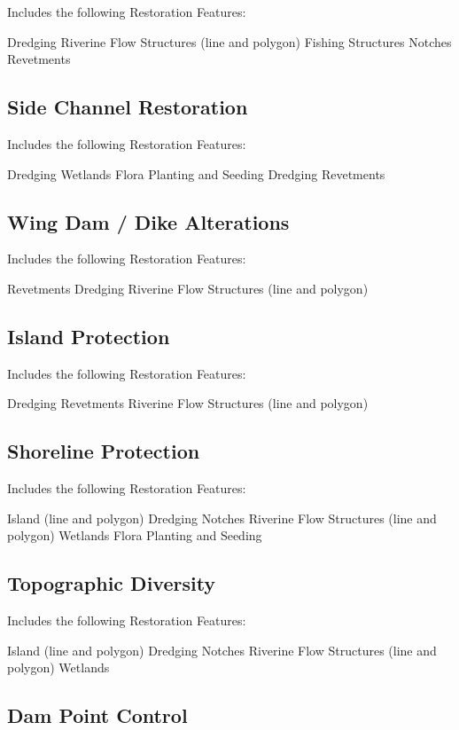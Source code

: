 \documentclass[
  letterpaper,
  DIV=11,
  numbers=noendperiod]{scrreprt}
\begin{document}
Includes the following Restoration Features:

Dredging Riverine Flow Structures (line and polygon) Fishing Structures
Notches Revetments

\subsection{Side Channel Restoration}\label{side-channel-restoration}

Includes the following Restoration Features:

Dredging Wetlands Flora Planting and Seeding Dredging Revetments

\subsection{Wing Dam / Dike
Alterations}\label{wing-dam-dike-alterations}

Includes the following Restoration Features:

Revetments Dredging Riverine Flow Structures (line and polygon)

\subsection{Island Protection}\label{island-protection}

Includes the following Restoration Features:

Dredging Revetments Riverine Flow Structures (line and polygon)

\subsection{Shoreline Protection}\label{shoreline-protection}

Includes the following Restoration Features:

Island (line and polygon) Dredging Notches Riverine Flow Structures
(line and polygon) Wetlands Flora Planting and Seeding

\subsection{Topographic Diversity}\label{topographic-diversity}

Includes the following Restoration Features:

Island (line and polygon) Dredging Notches Riverine Flow Structures
(line and polygon) Wetlands

\subsection{Dam Point Control}\label{dam-point-control}
\end{document}
